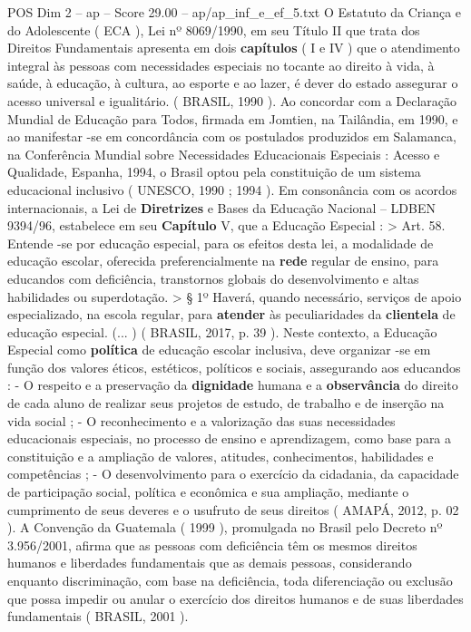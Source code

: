 \begin{textsample}{POS Dim 2 – ap – Score 29.00 – ap/ap\_inf\_e\_ef\_5.txt}
O Estatuto da Criança e do Adolescente ( ECA ), Lei nº 8069/1990, em seu Título II que trata dos Direitos Fundamentais apresenta em dois \textbf{capítulos} ( I e IV ) que o atendimento integral às pessoas com necessidades especiais no tocante ao direito à vida, à saúde, à educação, à cultura, ao esporte e ao lazer, é dever do estado assegurar o acesso universal e igualitário. ( BRASIL, 1990 ).
Ao concordar com a Declaração Mundial de Educação para Todos, firmada em Jomtien, na Tailândia, em 1990, e ao manifestar -se em concordância com os postulados produzidos em Salamanca, na Conferência Mundial sobre Necessidades Educacionais Especiais : Acesso e Qualidade, Espanha, 1994, o Brasil optou pela constituição de um sistema educacional inclusivo ( UNESCO, 1990 ; 1994 ).
Em consonância com os acordos internacionais, a Lei de \textbf{Diretrizes} e Bases da Educação Nacional – LDBEN 9394/96, estabelece em seu \textbf{Capítulo} V, que a Educação Especial : > Art. 58.
Entende -se por educação especial, para os efeitos desta lei, a modalidade de educação escolar, oferecida preferencialmente na \textbf{rede} regular de ensino, para educandos com deficiência, transtornos globais do desenvolvimento e altas habilidades ou superdotação. > § 1º Haverá, quando necessário, serviços de apoio especializado, na escola regular, para \textbf{atender} às peculiaridades da \textbf{clientela} de educação especial. (... ) ( BRASIL, 2017, p. 39 ).
Neste contexto, a Educação Especial como \textbf{política} de educação escolar inclusiva, deve organizar -se em função dos valores éticos, estéticos, políticos e sociais, assegurando aos educandos : - O respeito e a preservação da \textbf{dignidade} humana e a \textbf{observância} do direito de cada aluno de realizar seus projetos de estudo, de trabalho e de inserção na vida social ; - O reconhecimento e a valorização das suas necessidades educacionais especiais, no processo de ensino e aprendizagem, como base para a constituição e a ampliação de valores, atitudes, conhecimentos, habilidades e competências ; - O desenvolvimento para o exercício da cidadania, da capacidade de participação social, política e econômica e sua ampliação, mediante o cumprimento de seus deveres e o usufruto de seus direitos ( AMAPÁ, 2012, p. 02 ).
A Convenção da Guatemala ( 1999 ), promulgada no Brasil pelo Decreto nº 3.956/2001, afirma que as pessoas com deficiência têm os mesmos direitos humanos e liberdades fundamentais que as demais pessoas, considerando enquanto discriminação, com base na deficiência, toda diferenciação ou exclusão que possa impedir ou anular o exercício dos direitos humanos e de suas liberdades fundamentais ( BRASIL, 2001 ).

\end{textsample}

